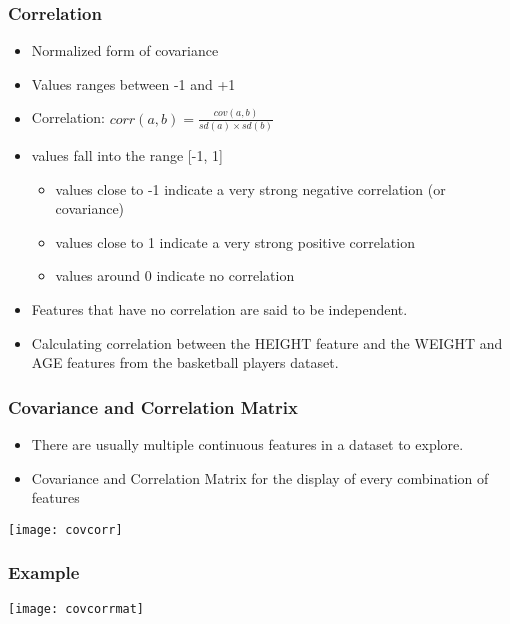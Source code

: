 \begin{frame}[fragile] \frametitle{Correlation}

\begin{itemize}
\item Normalized form of covariance 
\item Values ranges between -1 and +1
\item Correlation: $corr(a,b) = \frac{cov(a,b)}{sd(a) \times sd(b)}$
\item values fall into the range [-1, 1]
\begin{itemize}
\item values close to -1 indicate a very strong negative correlation (or covariance)
\item values close to 1 indicate a very strong positive correlation
\item values around 0 indicate no correlation
\end{itemize}
\item Features that have no correlation are said to be independent. 
\item Calculating correlation between the HEIGHT feature and the WEIGHT and AGE features from the basketball players dataset. 
\end{itemize}
\end{frame}



\begin{frame}[fragile]\frametitle{Covariance and Correlation Matrix}	
\begin{itemize}
\item There are usually multiple continuous features in a dataset to explore.
\item Covariance and Correlation Matrix for the display of every combination of features 
\end{itemize}
\begin{center}
\texttt{[image: covcorr]}
\end{center}
\end{frame}


\begin{frame}[fragile]\frametitle{Example}	
\begin{center}
\texttt{[image: covcorrmat]}
\end{center}
\end{frame}


